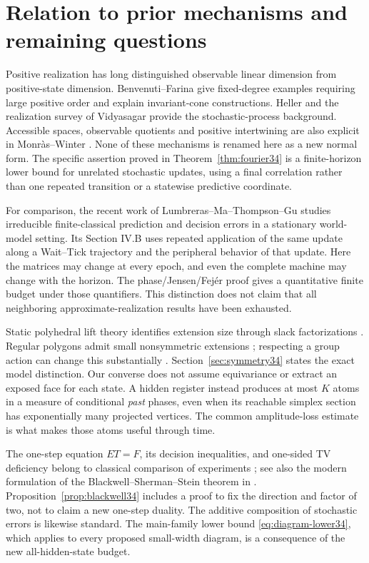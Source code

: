\section{Relation to prior mechanisms and remaining questions}
Positive realization has long distinguished observable linear dimension
from positive-state dimension. Benvenuti--Farina \cite{BF99,BF04} give
fixed-degree examples requiring large positive order and explain
invariant-cone constructions. Heller \cite{Heller} and the realization
survey of Vidyasagar \cite{Vidyasagar} provide the stochastic-process
background. Accessible spaces, observable quotients and positive
intertwining are also explicit in Monr\`as--Winter \cite{MW}. None of these
mechanisms is renamed here as a new normal form. The specific assertion
proved in Theorem~\ref{thm:fourier34} is a finite-horizon lower bound for
unrelated stochastic updates, using a final correlation rather than one
repeated transition or a statewise predictive coordinate.

For comparison, the recent work of Lumbreras--Ma--Thompson--Gu
\cite{LMTG} studies irreducible finite-classical prediction and decision
errors in a stationary world-model setting. Its Section IV.B uses repeated
application of the same update along a Wait--Tick trajectory and the
peripheral behavior of that update. Here the matrices may change at every
epoch, and even the complete machine may change with the horizon. The
phase/Jensen/Fej\'er proof gives a quantitative finite budget under those
quantifiers. This distinction does not claim that all neighboring
approximate-realization results have been exhausted.

Static polyhedral lift theory identifies extension size through slack
factorizations \cite{GPT}. Regular polygons admit small nonsymmetric
extensions \cite{FRT,VGG}; respecting a group action can change this
substantially \cite{KPT,FSP}. Section~\ref{sec:symmetry34} states the exact
model distinction. Our converse does not assume equivariance or extract
an exposed face for each state. A hidden register instead produces at
most $K$ atoms in a measure of conditional \emph{past} phases, even when
its reachable simplex section has exponentially many projected vertices.
The common amplitude-loss estimate is what makes those atoms useful
through time.

The one-step equation $ET=F$, its decision inequalities, and one-sided
TV deficiency belong to classical comparison of experiments
\cite{Blackwell,Torgersen}; see also the modern formulation of the
Blackwell--Sherman--Stein theorem in \cite{FGPR}. Proposition~\ref{prop:blackwell34}
includes a proof to fix the direction and factor of two, not to claim a
new one-step duality. The additive composition of stochastic errors is
likewise standard. The main-family lower bound
\eqref{eq:diagram-lower34}, which applies to every proposed small-width
diagram, is a consequence of the new all-hidden-state budget.

